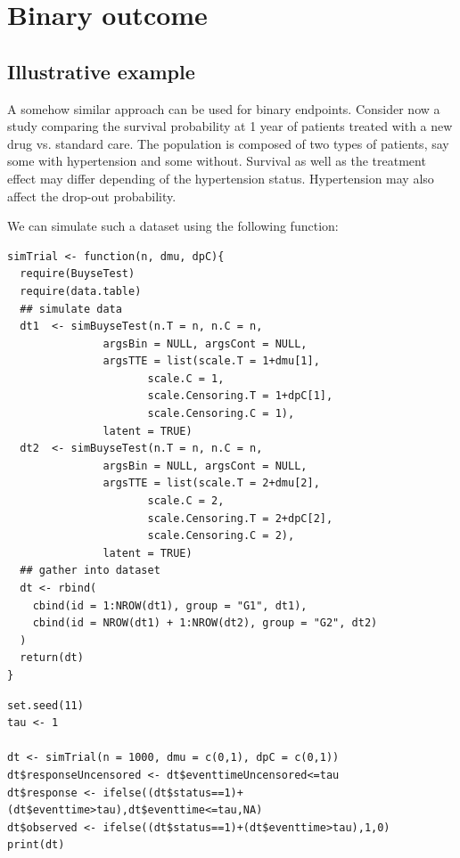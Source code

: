 \documentclass[12pt]{article}
\begin{document}
\clearpage

\section{Binary outcome}
\label{sec:orgb4e14e3}

\subsection{Illustrative example}
\label{sec:orgdce3a73}
A somehow similar approach can be used for binary endpoints. Consider
now a study comparing the survival probability at 1 year of patients
treated with a new drug vs. standard care. The population is composed
of two types of patients, say some with hypertension and some
without. Survival as well as the treatment effect may differ depending
of the hypertension status. Hypertension may also affect the drop-out
probability.

\bigskip

We can simulate such a dataset using the following function:
\lstset{language=r,label= ,caption= ,captionpos=b,numbers=none}
\begin{lstlisting}
simTrial <- function(n, dmu, dpC){
  require(BuyseTest)
  require(data.table)
  ## simulate data
  dt1  <- simBuyseTest(n.T = n, n.C = n, 
		       argsBin = NULL, argsCont = NULL, 
		       argsTTE = list(scale.T = 1+dmu[1],
				      scale.C = 1,
				      scale.Censoring.T = 1+dpC[1],
				      scale.Censoring.C = 1),
		       latent = TRUE)
  dt2  <- simBuyseTest(n.T = n, n.C = n, 
		       argsBin = NULL, argsCont = NULL, 
		       argsTTE = list(scale.T = 2+dmu[2],
				      scale.C = 2,
				      scale.Censoring.T = 2+dpC[2],
				      scale.Censoring.C = 2),
		       latent = TRUE)
  ## gather into dataset
  dt <- rbind(
    cbind(id = 1:NROW(dt1), group = "G1", dt1),
    cbind(id = NROW(dt1) + 1:NROW(dt2), group = "G2", dt2)
  )
  return(dt)
}
\end{lstlisting}

\clearpage

\lstset{language=r,label= ,caption= ,captionpos=b,numbers=none}
\begin{lstlisting}
set.seed(11)
tau <- 1

dt <- simTrial(n = 1000, dmu = c(0,1), dpC = c(0,1))
dt$responseUncensored <- dt$eventtimeUncensored<=tau
dt$response <- ifelse((dt$status==1)+(dt$eventtime>tau),dt$eventtime<=tau,NA)
dt$observed <- ifelse((dt$status==1)+(dt$eventtime>tau),1,0)
print(dt)
\end{lstlisting}
\end{document}
